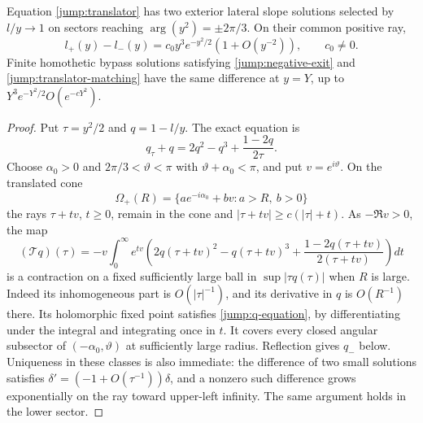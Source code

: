 \begin{lemma}\label{jump:stokes}
Equation \eqref{jump:translator} has two exterior lateral slope
solutions selected by $l/y\to1$ on sectors reaching
$\arg(y^2)=\pm2\pi/3$.  On their common positive ray,
\begin{equation}\label{jump:stokes-difference}
 l_+(y)-l_-(y)=c_0y^3e^{-y^2/2}(1+O(y^{-2})),
 \qquad c_0\ne0.
\end{equation}
Finite homothetic bypass solutions satisfying
\eqref{jump:negative-exit} and
\eqref{jump:translator-matching} have the same difference at
$y=Y$, up to $Y^3e^{-Y^2/2}O(e^{-cY^2})$.
\end{lemma}

\begin{proof}
Put $\tau=y^2/2$ and $q=1-l/y$.  The exact equation is
\begin{equation}\label{jump:q-equation}
 q_\tau+q=2q^2-q^3+\frac{1-2q}{2\tau}.
\end{equation}
Choose $\alpha_0>0$ and
$2\pi/3<\vartheta<\pi$ with
$\vartheta+\alpha_0<\pi$, and put $v=e^{i\vartheta}$.
On the translated cone
\[
 \Omega_+(R)=
 \{a e^{-i\alpha_0}+bv:a>R,\ b>0\}
\]
the rays $\tau+tv$, $t\geq0$, remain in the cone and
$|\tau+tv|\geq c(|\tau|+t)$.  As $-\Re v>0$, the map
\begin{equation}\label{jump:volterra}
 (\mathcal Tq)(\tau)=-v\int_0^\infty e^{tv}
 \left(2q(\tau+tv)^2-q(\tau+tv)^3+
                 \frac{1-2q(\tau+tv)}{2(\tau+tv)}\right)dt
\end{equation}
is a contraction on a fixed sufficiently large ball in
$\sup|\tau q(\tau)|$ when $R$ is large.  Indeed its inhomogeneous
part is $O(|\tau|^{-1})$, and its derivative in $q$ is
$O(R^{-1})$ there.  Its holomorphic fixed point satisfies
\eqref{jump:q-equation}, by differentiating under the integral
and integrating once in $t$.  It covers every closed angular
subsector of $(-\alpha_0,\vartheta)$ at sufficiently large
radius.  Reflection gives $q_-$ below.  Uniqueness in these
classes is also immediate: the difference of two small solutions
satisfies $\delta'=(-1+O(\tau^{-1}))\delta$, and a nonzero such
difference grows exponentially on the ray toward upper-left
infinity.  The same argument holds in the lower sector.


\end{proof}
